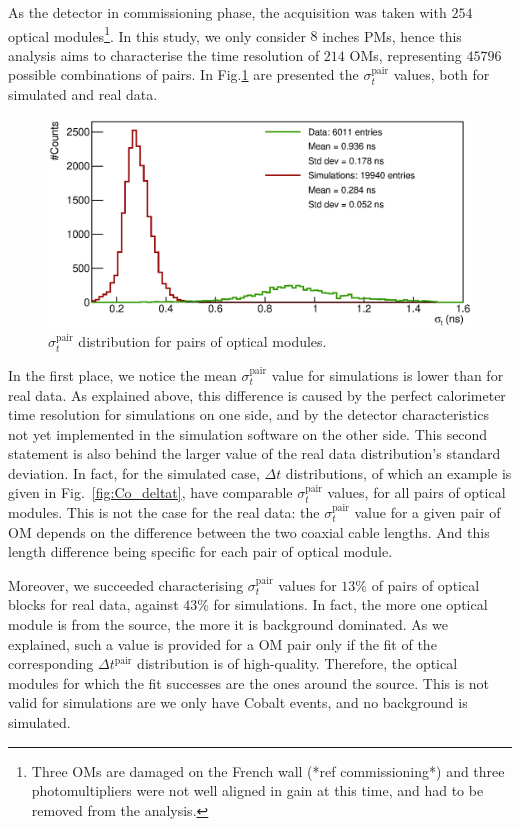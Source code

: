 As the detector in commissioning phase, the acquisition was taken with $254$ optical modules\footnote{Three OMs are damaged on the French wall (*ref commissioning*) and three photomultipliers were not well aligned in gain at this time, and had to be removed from the analysis.}.
In this study, we only consider $8$ inches PMs, hence this analysis aims to characterise the time resolution of $214$ OMs, representing $45796$ possible combinations of pairs.
In Fig.\ref{fig:Co_corr_sigma} are presented the $\sigma_{t}^{\text{pair}}$ values, both for simulated and real data.
\begin{figure}[h]
  \centering
  \includegraphics[width=15cm]{commissioning/fig_commissioning/Co_corr_sigma.eps}
  \caption{$\sigma_{t}^{\text{pair}}$ distribution for pairs of optical modules.
    \label{fig:Co_corr_sigma}}
\end{figure}
In the first place, we notice the mean $\sigma_{t}^{\text{pair}}$ value for simulations is lower than for real data.
As explained above, this difference is caused by the perfect calorimeter time resolution for simulations on one side, and by the detector characteristics not yet implemented in the simulation software on the other side.
This second statement is also behind the larger value of the real data distribution's standard deviation.
In fact, for the simulated case, $\Delta{t}$ distributions, of which an example is given in Fig.~\ref{fig:Co_deltat}, have comparable $\sigma_{t}^{\text{pair}}$ values, for all pairs of optical modules.
This is not the case for the real data: the $\sigma_{t}^{\text{pair}}$ value for a given pair of OM depends on the difference between the two coaxial cable lengths.
And this length difference being specific for each pair of optical module.

Moreover, we succeeded characterising $\sigma_{t}^{\text{pair}}$ values for $13$\% of pairs of optical blocks for real data, against $43$\% for simulations.
In fact, the more one optical module is from the source, the more it is background dominated.
As we explained, such a value is provided for a OM pair only if the fit of the corresponding $\Delta t^{\text{pair}}$ distribution is of high-quality.
Therefore, the optical modules for which the fit successes are the ones around the source.
This is not valid for simulations are we only have Cobalt events, and no background is simulated.

